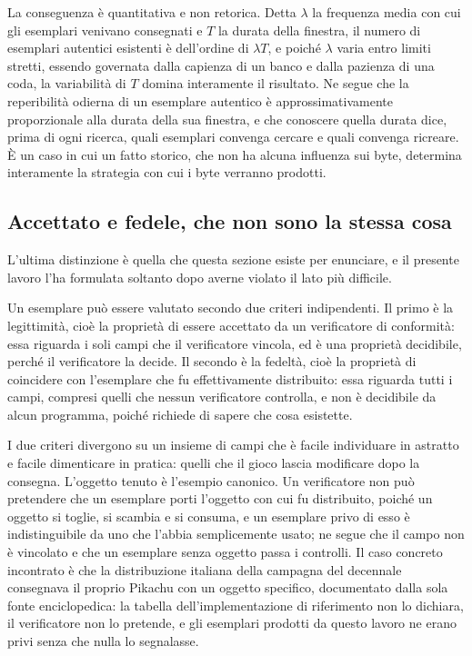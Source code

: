 La conseguenza è quantitativa e non retorica. Detta $\lambda$ la frequenza media con cui gli esemplari venivano consegnati e $T$ la durata della finestra, il numero di esemplari autentici esistenti è dell'ordine di $\lambda T$, e poiché $\lambda$ varia entro limiti stretti, essendo governata dalla capienza di un banco e dalla pazienza di una coda, la variabilità di $T$ domina interamente il risultato. Ne segue che la reperibilità odierna di un esemplare autentico è approssimativamente proporzionale alla durata della sua finestra, e che conoscere quella durata dice, prima di ogni ricerca, quali esemplari convenga cercare e quali convenga ricreare. È un caso in cui un fatto storico, che non ha alcuna influenza sui byte, determina interamente la strategia con cui i byte verranno prodotti.

\subsection*{Accettato e fedele, che non sono la stessa cosa}

L'ultima distinzione è quella che questa sezione esiste per enunciare, e il presente lavoro l'ha formulata soltanto dopo averne violato il lato più difficile.

Un esemplare può essere valutato secondo due criteri indipendenti. Il primo è la legittimità, cioè la proprietà di essere accettato da un verificatore di conformità: essa riguarda i soli campi che il verificatore vincola, ed è una proprietà decidibile, perché il verificatore la decide. Il secondo è la fedeltà, cioè la proprietà di coincidere con l'esemplare che fu effettivamente distribuito: essa riguarda tutti i campi, compresi quelli che nessun verificatore controlla, e non è decidibile da alcun programma, poiché richiede di sapere che cosa esistette.

I due criteri divergono su un insieme di campi che è facile individuare in astratto e facile dimenticare in pratica: quelli che il gioco lascia modificare dopo la consegna. L'oggetto tenuto è l'esempio canonico. Un verificatore non può pretendere che un esemplare porti l'oggetto con cui fu distribuito, poiché un oggetto si toglie, si scambia e si consuma, e un esemplare privo di esso è indistinguibile da uno che l'abbia semplicemente usato; ne segue che il campo non è vincolato e che un esemplare senza oggetto passa i controlli. Il caso concreto incontrato è che la distribuzione italiana della campagna del decennale consegnava il proprio Pikachu con un oggetto specifico, documentato dalla sola fonte enciclopedica: la tabella dell'implementazione di riferimento non lo dichiara, il verificatore non lo pretende, e gli esemplari prodotti da questo lavoro ne erano privi senza che nulla lo segnalasse.

